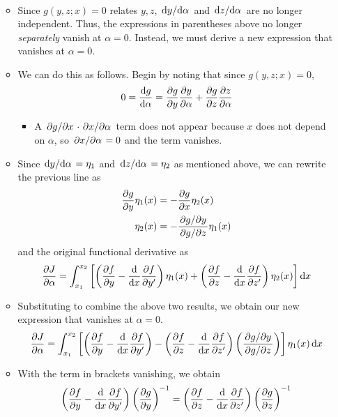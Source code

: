 \documentclass[../notes.tex]{subfiles}
\begin{document}
\begin{itemize}
\begin{itemize}
\begin{itemize}
\begin{align*}
            \end{align*}
        \end{itemize}
        \item Since $g(y,z;x)=0$ relates $y,z$, $\dv*{y}{\alpha}$ and $\dv*{z}{\alpha}$ are no longer independent. Thus, the expressions in parentheses above no longer \emph{separately} vanish at $\alpha=0$. Instead, we must derive a new expression that vanishes at $\alpha=0$.
        \item We can do this as follows. Begin by noting that since $g(y,z;x)=0$,
        \begin{equation*}
            0 = \dv{g}{\alpha} = \pdv{g}{y}\pdv{y}{\alpha}+\pdv{g}{z}\pdv{z}{\alpha}
        \end{equation*}
        \begin{itemize}
            \item A $\pdv*{g}{x}\cdot\pdv*{x}{\alpha}$ term does not appear because $x$ does not depend on $\alpha$, so $\pdv*{x}{\alpha}=0$ and the term vanishes.
        \end{itemize}
        \item Since $\dv*{y}{\alpha}=\eta_1$ and $\dv*{z}{\alpha}=\eta_2$ as mentioned above, we can rewrite the previous line as
        \begin{align*}
            \pdv{g}{y}\eta_1(x) &= -\pdv{g}{x}\eta_2(x)\\
            \eta_2(x) &= -\frac{\pdv*{g}{y}}{\pdv*{g}{z}}\eta_1(x)
        \end{align*}
        and the original functional derivative as
        \begin{equation*}
            \pdv{J}{\alpha} = \int_{x_1}^{x_2}\left[ \left( \pdv{f}{y}-\dv{x}\pdv{f}{y'} \right)\eta_1(x)+\left( \pdv{f}{z}-\dv{x}\pdv{f}{z'} \right)\eta_2(x) \right]\dd{x}
        \end{equation*}
        \item Substituting to combine the above two results, we obtain our new expression that vanishes at $\alpha=0$.
        \begin{equation*}
            \pdv{J}{\alpha} = \int_{x_1}^{x_2}\left[ \left( \pdv{f}{y}-\dv{x}\pdv{f}{y'} \right)-\left( \pdv{f}{z}-\dv{x}\pdv{f}{z'} \right)\left( \frac{\pdv*{g}{y}}{\pdv*{g}{z}} \right) \right]\eta_1(x)\dd{x}
        \end{equation*}
        \item With the term in brackets vanishing, we obtain
        \begin{equation*}
            \left( \pdv{f}{y}-\dv{x}\pdv{f}{y'} \right)\left( \pdv{g}{y} \right)^{-1} = \left( \pdv{f}{z}-\dv{x}\pdv{f}{z'} \right)\left( \pdv{g}{z} \right)^{-1}

\end{equation*}
\end{itemize}
\end{itemize}
\end{document}

